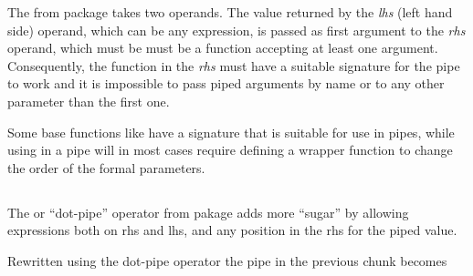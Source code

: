 \documentclass[krantz2]{krantz}\usepackage{knitr}%
\begin{document}
\begin{knitrout}\footnotesize
{}\color{fgcolor}
\end{knitrout}

\begin{explainbox}
The \Roperator{\%>\%} from package  takes two operands. The value returned by the \emph{lhs} (left hand side) operand, which can be any \Rlang expression, is passed as first argument to the \emph{rhs} operand, which must be must be a function accepting at least one argument. Consequently, the function in the \emph{rhs} must have a suitable signature for the pipe to work and it is impossible to pass piped arguments by name or to any other parameter than the first one.

Some base \Rlang functions like  have a signature that is suitable for use in pipes, while using  in a pipe will in most cases require defining a wrapper function to change the order of the formal parameters.
\end{explainbox}

\subsection{}

The  or ``dot-pipe'' operator from pakage  adds more ``sugar'' by allowing expressions both on rhs and lhs, and any position in the rhs for the piped value.

Rewritten using the dot-pipe operator the pipe in the previous chunk becomes

\begin{knitrout}\footnotesize
{}\color{fgcolor}
\end{knitrout}
\end{document}
